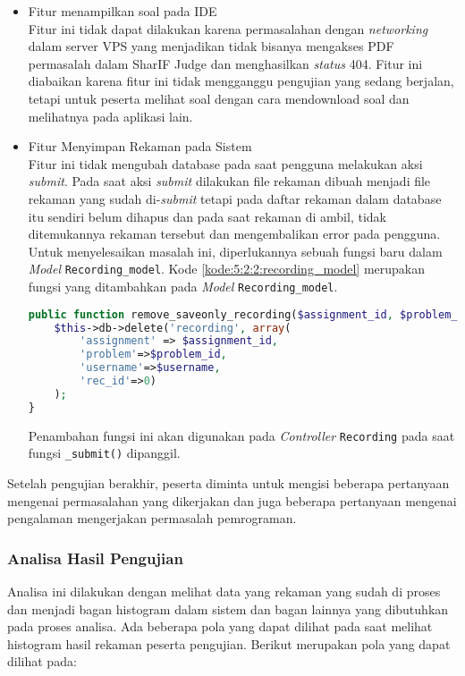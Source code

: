 \begin{itemize}
    \item Fitur menampilkan soal pada IDE \\
    Fitur ini tidak dapat dilakukan karena permasalahan dengan \textit{networking} dalam server VPS yang menjadikan tidak bisanya mengakses PDF permasalah dalam SharIF Judge dan menghasilkan \textit{status} 404. Fitur ini diabaikan karena fitur ini tidak mengganggu pengujian yang sedang berjalan, tetapi untuk peserta melihat soal dengan cara mendownload soal dan melihatnya pada aplikasi lain. 
    \item Fitur Menyimpan Rekaman pada Sistem \\
    Fitur ini tidak mengubah database pada saat pengguna melakukan aksi \textit{submit}. Pada saat aksi \textit{submit} dilakukan file rekaman dibuah menjadi file rekaman yang sudah di-\textit{submit} tetapi pada daftar rekaman dalam database itu sendiri belum dihapus dan pada saat rekaman di ambil, tidak ditemukannya rekaman tersebut dan mengembalikan error pada pengguna. Untuk menyelesaikan masalah ini, diperlukannya sebuah fungsi baru dalam \textit{Model} \verb|Recording_model|. Kode \ref{kode:5:2:2:recording_model} merupakan fungsi yang ditambahkan pada \textit{Model} \verb|Recording_model|. 

    \begin{lstlisting}[language=php, caption={Fungsi tambahan pada \textit{Recording model}}, label=kode:5:2:2:recording_model]
public function remove_saveonly_recording($assignment_id, $problem_id, $username) {
    $this->db->delete('recording', array(
        'assignment' => $assignment_id, 
        'problem'=>$problem_id, 
        'username'=>$username, 
        'rec_id'=>0)
    );
}
    \end{lstlisting}

    Penambahan fungsi ini akan digunakan pada \textit{Controller} \verb|Recording| pada saat fungsi \verb|_submit()| dipanggil.

\end{itemize}

Setelah pengujian berakhir, peserta diminta untuk mengisi beberapa pertanyaan mengenai permasalahan yang dikerjakan dan juga beberapa pertanyaan mengenai pengalaman mengerjakan permasalah pemrograman. 

\subsubsection{Analisa Hasil Pengujian}
Analisa ini dilakukan dengan melihat data yang rekaman yang sudah di proses dan menjadi bagan histogram dalam sistem dan bagan lainnya yang dibutuhkan pada proses analisa. Ada beberapa pola yang dapat dilihat pada saat melihat histogram hasil rekaman peserta pengujian. Berikut merupakan pola yang dapat dilihat pada:

